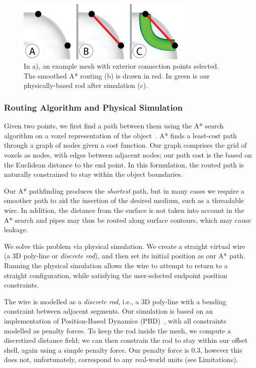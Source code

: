 \begin{figure}[h!]
\centering
    \includegraphics[width=3.4in]{figures/exterior.png}
\caption{In a), an example mesh with exterior connection points selected.  The smoothed A* routing (b) is drawn in {\color{red}red}.  In {\color{tovi}green} is our physically-based rod after simulation (c).}
\label{fig:tool-process-exterior}
\end{figure}

\subsubsection{Routing Algorithm and Physical Simulation}
Given two points, we first find a path between them using the A* search algorithm on a voxel representation of the object~\cite{Hart-Astar}. A* finds a least-cost path through a graph of nodes given a cost function. Our graph comprises the grid of voxels as nodes, with edges between adjacent nodes; our path cost is the based on the Euclidean distance to the end point. In this formulation, the routed path is naturally constrained to stay within the object boundaries.

Our A* pathfinding produces the \emph{shortest} path, but in many cases
we require a smoother path to aid the insertion of the desired medium, such as a threadable wire.
In addition, the distance from the surface is not taken into account in the A* search and pipes may thus be routed along surface contours, which may cause leakage.

We solve this problem via physical simulation. We create a straight virtual 
wire (a 3D poly-line or \emph{discrete rod}), and then set its initial position 
as our A* path.
Running the physical simulation allows the wire to attempt to return to
a straight configuration, while satisfying the user-selected endpoint position constraints.

The wire is modelled as a \emph{discrete rod}, i.e., a 3D poly-line with a bending 
constraint between adjacent segments. Our simulation is based on an
implementation of Position-Based Dynamics (PBD)~\cite{Muller07}, with all constraints
modelled as penalty forces. To keep the rod inside the
mesh, we compute a discretized distance field; we can then constrain the
rod to stay within our offset shell, again using a simple penalty force.  Our penalty force is 0.3, however this does not, unfortunately, correspond to any real-world units (see Limitations).

